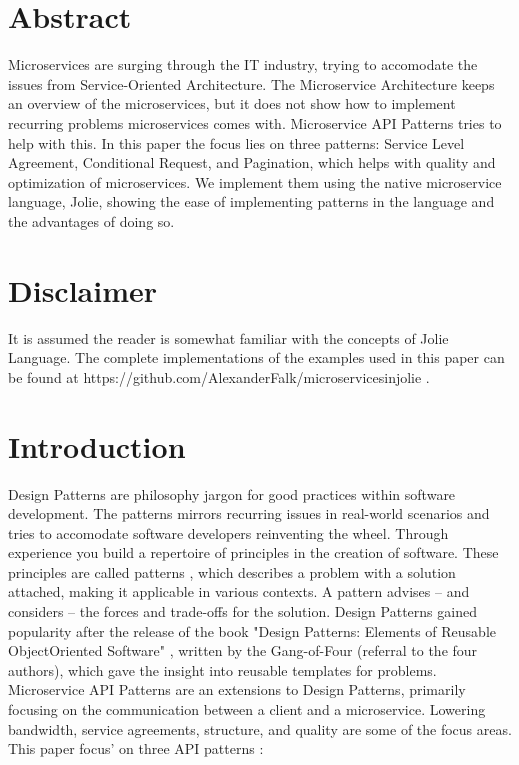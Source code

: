 \documentclass[12pt]{article}
\begin{document}

\tableofcontents
\newpage


\section{Abstract}
Microservices are surging through the IT industry, trying to accomodate the issues from Service-Oriented Architecture. The Microservice Architecture keeps an overview of the microservices, but it does not show how to implement recurring problems microservices comes with. Microservice API Patterns tries to help with this. In this paper the focus lies on three patterns: Service Level Agreement, Conditional Request, and Pagination, which helps with quality and optimization of microservices. We implement them using the native microservice language, Jolie, showing the ease of implementing patterns in the language and the advantages of doing so.

\section{Disclaimer}
It is assumed the reader is somewhat familiar with the concepts of Jolie Language. The complete implementations of the examples used in this paper can be found at https://github.com/AlexanderFalk/microservicesinjolie .

\newpage

\section{Introduction}
Design Patterns are philosophy jargon for good practices within software development. The patterns mirrors recurring issues in real-world scenarios and tries to accomodate software developers reinventing the wheel. Through experience you build a repertoire of principles in the creation of software. These principles are called patterns \cite{Applying_Patterns}, which describes a problem with a solution attached, making it applicable in various contexts. A pattern advises -- and considers -- the forces and trade-offs for the solution. Design Patterns gained popularity after the release of the book "Design Patterns: Elements of Reusable Object\-Oriented Software" \cite{DesignPGoF}, written by the Gang-of-Four (referral to the four authors), which gave the insight into reusable templates for problems. Microservice API Patterns are an extensions to Design Patterns, primarily focusing on the communication between a client and a microservice. Lowering bandwidth, service agreements, structure, and quality are some of the focus areas. \\
This paper focus' on three API patterns \cite{MAPIPweb}: 
\end{document}

